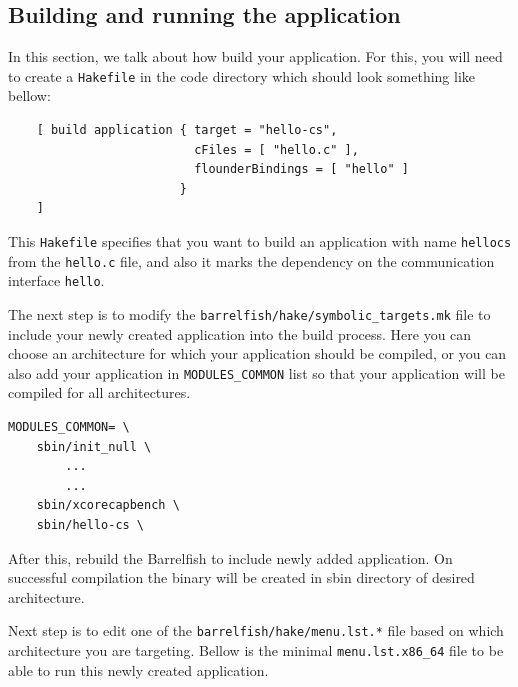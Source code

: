 \subsection{Building and running the application}

In this section, we talk about how build your application.  For this, you
will need to create a \texttt{Hakefile} in the code directory which should
look something like bellow:

\begin{verbatim}
    [ build application { target = "hello-cs",
                          cFiles = [ "hello.c" ],
                          flounderBindings = [ "hello" ]
                        }
    ]
\end{verbatim}

This \texttt{Hakefile} specifies that you want to build an application
with name \texttt{hello\-cs} from the \texttt{hello.c} file, and also
it marks the dependency on the communication interface \texttt{hello}.

The next step is to modify the \texttt{barrelfish/hake/symbolic\_targets.mk}
file to include your newly created application into the build process.
Here you can choose an architecture for which your application should be
compiled, or you can also add your application in \texttt{MODULES\_COMMON}
list so that your application will be compiled for all architectures.

\begin{verbatim}
MODULES_COMMON= \
	sbin/init_null \
        ...
        ...
	sbin/xcorecapbench \
	sbin/hello-cs \

\end{verbatim}

After this, rebuild the Barrelfish to include newly added application.  On
successful compilation the binary will be created in sbin directory of
desired architecture.


Next step is to edit one of the \texttt{barrelfish/hake/menu.lst.*} file based
on which architecture you are targeting.  Bellow is the minimal
\texttt{menu.lst.x86\_64} file to be able to run this newly created application.

